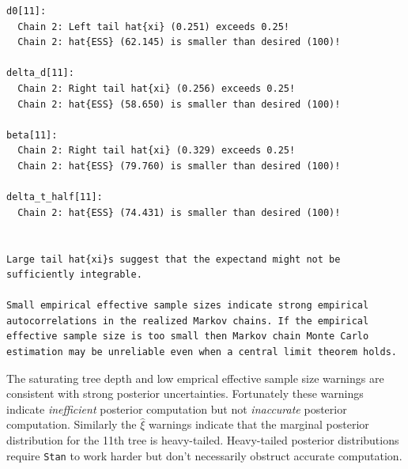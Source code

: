 \documentclass[
  letterpaper,
  DIV=11,
  numbers=noendperiod]{scrartcl}
\newenvironment{Shaded}{\begin{snugshade}}{\end{snugshade}}
\newcommand{\AttributeTok}[1]{\textcolor[rgb]{0.40,0.45,0.13}{#1}}
\newcommand{\ConstantTok}[1]{\textcolor[rgb]{0.56,0.35,0.01}{#1}}
\newcommand{\FunctionTok}[1]{\textcolor[rgb]{0.28,0.35,0.67}{#1}}
\newcommand{\NormalTok}[1]{\textcolor[rgb]{0.00,0.23,0.31}{#1}}
\newcommand{\OtherTok}[1]{\textcolor[rgb]{0.00,0.23,0.31}{#1}}
\newcommand{\SpecialCharTok}[1]{\textcolor[rgb]{0.37,0.37,0.37}{#1}}
\newcommand{\StringTok}[1]{\textcolor[rgb]{0.13,0.47,0.30}{#1}}
\begin{document}
\begin{Shaded}
\end{Shaded}

\begin{verbatim}
d0[11]:
  Chain 2: Left tail hat{xi} (0.251) exceeds 0.25!
  Chain 2: hat{ESS} (62.145) is smaller than desired (100)!

delta_d[11]:
  Chain 2: Right tail hat{xi} (0.256) exceeds 0.25!
  Chain 2: hat{ESS} (58.650) is smaller than desired (100)!

beta[11]:
  Chain 2: Right tail hat{xi} (0.329) exceeds 0.25!
  Chain 2: hat{ESS} (79.760) is smaller than desired (100)!

delta_t_half[11]:
  Chain 2: hat{ESS} (74.431) is smaller than desired (100)!


Large tail hat{xi}s suggest that the expectand might not be
sufficiently integrable.

Small empirical effective sample sizes indicate strong empirical
autocorrelations in the realized Markov chains. If the empirical
effective sample size is too small then Markov chain Monte Carlo
estimation may be unreliable even when a central limit theorem holds.
\end{verbatim}

The saturating tree depth and low emprical effective sample size
warnings are consistent with strong posterior uncertainties. Fortunately
these warnings indicate \emph{inefficient} posterior computation but not
\emph{inaccurate} posterior computation. Similarly the \(\hat{\xi}\)
warnings indicate that the marginal posterior distribution for the 11th
tree is heavy-tailed. Heavy-tailed posterior distributions require
\texttt{Stan} to work harder but don't necessarily obstruct accurate
computation.
\end{document}
